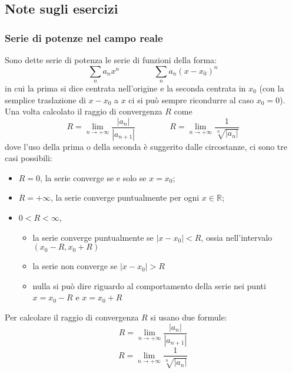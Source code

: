 \subsection{Note sugli esercizi}
\subsubsection{Serie di potenze nel campo reale}
Sono dette serie di potenza le serie di funzioni della forma:
\[
    \sum_{n} a_nx^n \;\;\;\;\;\;\;\;\;\;\;\;\;\;\;\sum_{n}a_n(x-x_0)^n
\]
in cui la prima si dice centrata nell'origine e la seconda centrata in $x_0$ (con la semplice traslazione di $x-x_0$ a $x$ ci si può sempre ricondurre al caso $x_0 = 0$).\newline
\newline
Una volta calcolato il raggio di convergenza $R$ come
\[
    R = \lim_{n\rightarrow +\infty} \frac{|a_n|}{|a_{n+1}|} \;\;\;\;\;\;\;\;\;\;\;\;\;\;\;R = \lim_{n\rightarrow +\infty} \frac{1}{\sqrt[n]{|a_n|}}
\] dove l'uso della prima o della seconda è suggerito dalle circostanze, ci sono tre casi possibili:
\begin{itemize}
    \item $R = 0$, la serie converge se e solo se $x = x_0$;
    \item $R = +\infty$, la serie converge puntualmente per ogni $x \in \mathbb{R}$;
    \item $0 < R < \infty$, \begin{itemize}
        \item la serie converge puntualmente se $|x-x_0| < R$, ossia nell'intervalo $(x_0-R, x_0 + R)$
        \item la serie non converge se $|x-x_0| > R$
        \item nulla si può dire riguardo al comportamento della serie nei punti $x = x_0 - R$ e $x= x_0+R$
    \end{itemize}
\end{itemize}
Per calcolare il raggio di convergenza $R$ si usano due formule:
\[
    R = \lim_{n\rightarrow +\infty} \frac{|a_n|}{|a_{n+1}|}
\]
\[
    R = \lim_{n\rightarrow +\infty} \frac{1}{\sqrt[n]{|a_n|}}
\]

